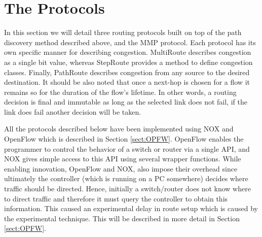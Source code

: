 

\section{The Protocols}
\label{sect:proto}

In this section we will detail three routing protocols built on top of the path
discovery method described above, and the MMP protocol. Each protocol has its own
specific manner for describing congestion. MultiRoute describes congestion as a
single bit value, whereas StepRoute provides a method to define congestion
classes. Finally, PathRoute describes congestion from any source to the desired
destination. It should be also noted that once a next-hop is chosen for a flow
it remains so for the duration of the flow's lifetime. In other words, a routing
decision is final and immutable as long as the selected link does not fail, if the link does fail another decision will be taken.  

All the protocols described below have been implemented using NOX \cite{NOX} and
OpenFlow \cite{OPFW} which is described in Section \ref{sect:OPFW}. OpenFlow
enables the programmer to control the behavior of a switch or router via a single API, and NOX gives simple access to
this API using several wrapper functions. While enabling innovation, OpenFlow
and NOX, also impose their overhead since ultimately the controller (which is
running on a PC somewhere) decides where traffic should be directed. Hence,
initially a switch/router does not know where to direct traffic and therefore it must
query the controller to obtain this information. This caused an experimental delay
in route setup which is caused by the experimental technique. This will be
described in more detail in Section \ref{sect:OPFW}.

